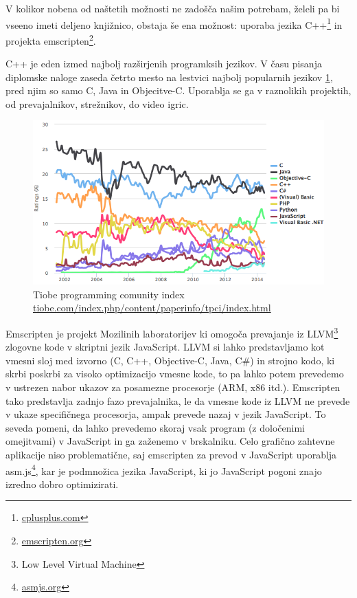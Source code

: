 V kolikor nobena od naštetih možnosti ne zadošča našim potrebam, želeli pa bi vseeno imeti deljeno knjižnico, obstaja še ena možnost: uporaba jezika C++\footnote{\href{http://www.cplusplus.com}{cplusplus.com}} in projekta emscripten\footnote{\href{http://emscripten.org}{emscripten.org}}.

C++ je eden izmed najbolj razširjenih programksih jezikov. V času pisanja diplomske naloge zaseda četrto mesto na lestvici najbolj popularnih jezikov \ref{fig:tiobe-index}, pred njim so samo C, Java in Objecitve-C. Uporablja se ga v raznolikih projektih, od prevajalnikov, strežnikov, do video igric.

\begin{figure}
 \includegraphics[width=\linewidth]{tiobe-index}
 \caption{Tiobe programming comunity index \protect\href{http://www.tiobe.com/index.php/content/paperinfo/tpci/index.html}{tiobe.com/index.php/content/paperinfo/tpci/index.html}}
 \label{fig:tiobe-index}
\end{figure}

Emscripten je projekt Mozilinih laboratorijev ki omogoča prevajanje iz LLVM\footnote{Low Level Virtual Machine} zlogovne kode v skriptni jezik JavaScript. LLVM si lahko predstavljamo kot vmesni sloj med izvorno (C, C++, Objective-C, Java, C\#) in strojno kodo, ki skrbi poskrbi za visoko optimizacijo vmesne kode, to pa lahko potem prevedemo v ustrezen nabor ukazov za posamezne procesorje (ARM, x86 itd.). Emscripten tako predstavlja zadnjo fazo prevajalnika, le da vmesne kode iz LLVM ne prevede v ukaze specifičnega procesorja, ampak prevede nazaj v jezik JavaScript. To seveda pomeni, da lahko prevedemo skoraj vsak program (z določenimi omejitvami) v JavaScript in ga zaženemo v brskalniku. Celo grafično zahtevne aplikacije niso problematične, saj emscripten za prevod v JavaScript uporablja asm.js\footnote{\href{http://asmjs.org}{asmjs.org}}, kar je podmnožica jezika JavaScript, ki jo JavaScript pogoni znajo izredno dobro optimizirati.

